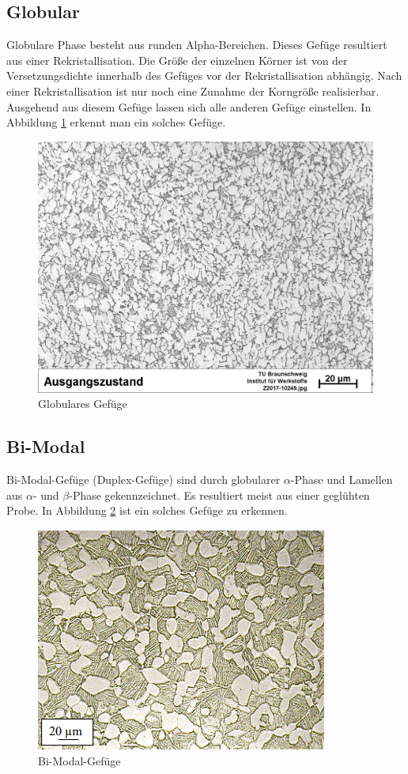 \documentclass[a4paper, 11pt]{tubsreprt}
\begin{document}
\subsection{Globular}
Globulare Phase besteht aus runden Alpha-Bereichen. Dieses Gefüge resultiert aus einer Rekristallisation. Die Größe der einzelnen Körner ist von der Versetzungsdichte innerhalb des Gefüges vor der Rekristallisation abhängig. Nach einer Rekristallisation ist nur noch eine Zunahme der Korngröße realisierbar. Ausgehend aus diesem Gefüge lassen sich alle anderen Gefüge einstellen. In Abbildung \ref{globular} erkennt man ein solches Gefüge. 
\begin{figure} %
\centering
\includegraphics[scale=0.6]{Bilder/Ausgangsgefuege.jpg}
\caption{Globulares Gefüge}
\label{globular}
\end{figure}

\subsection{Bi-Modal}
Bi-Modal-Gefüge (Duplex-Gefüge) sind durch globularer $\alpha$-Phase und Lamellen aus $\alpha$- und $\beta$-Phase gekennzeichnet. Es resultiert meist aus einer geglühten Probe.  In Abbildung \ref{bimodal} ist ein solches Gefüge zu erkennen. 
\begin{figure}
\centering
\includegraphics[scale=1]{Bilder/Duplexgefuege.PNG}
\caption[Bi-Modal-Gefüge]{Bi-Modal-Gefüge\cite{Werkstoffdesign2012}}
\label{bimodal}
\end{figure}
\end{document}
